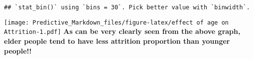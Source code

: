 \documentclass[]{article}
\newenvironment{Shaded}{\begin{snugshade}}{\end{snugshade}}
\newcommand{\CommentTok}[1]{\textcolor[rgb]{0.56,0.35,0.01}{\textit{#1}}}
\newcommand{\DataTypeTok}[1]{\textcolor[rgb]{0.13,0.29,0.53}{#1}}
\newcommand{\DecValTok}[1]{\textcolor[rgb]{0.00,0.00,0.81}{#1}}
\newcommand{\KeywordTok}[1]{\textcolor[rgb]{0.13,0.29,0.53}{\textbf{#1}}}
\newcommand{\NormalTok}[1]{#1}
\newcommand{\OperatorTok}[1]{\textcolor[rgb]{0.81,0.36,0.00}{\textbf{#1}}}
\newcommand{\StringTok}[1]{\textcolor[rgb]{0.31,0.60,0.02}{#1}}
\begin{document}
\begin{Shaded}
\end{Shaded}

\begin{verbatim}
## `stat_bin()` using `bins = 30`. Pick better value with `binwidth`.
\end{verbatim}

\texttt{[image: Predictive\_Markdown\_files/figure-latex/effect of age on Attrition-1.pdf]}
\textbf{As can be very clearly seen from the above graph, elder people
tend to have less attrition proportion than younger people!!}
\end{document}
